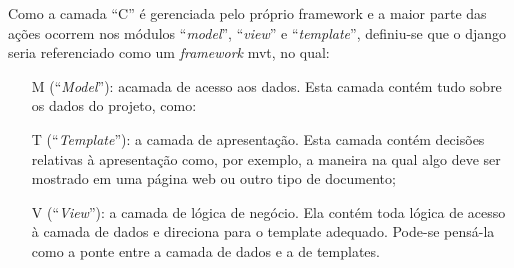 \begin{description}
\begin{itemize}
        \end{itemize}
        Como a camada ``C'' é gerenciada pelo próprio framework e a maior parte das ações ocorrem nos módulos ``\textit{model}'', ``\textit{view}'' e ``\textit{template}'', definiu-se que o \gls{django} seria referenciado como um \textit{framework} \gls{mvt}, no qual:
        \begin{itemize}
	        \item[M](``\textit{Model}''): acamada de acesso aos dados. Esta camada contém tudo sobre os dados do projeto, como:
	        \item[T](``\textit{Template}''): a camada de apresentação. Esta camada contém decisões relativas à apresentação como, por exemplo, a maneira na qual algo deve ser mostrado em uma página web ou outro tipo de documento;
            \item[V](``\textit{View}''): a camada de lógica de negócio. Ela contém toda lógica de acesso à camada de dados e direciona para o template adequado. Pode-se pensá-la como a ponte entre a camada de dados e a de templates.
        \end{itemize}        

\end{description}